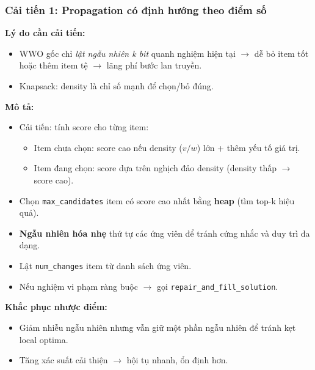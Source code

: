 \begin{frame}
    \frametitle{Cải tiến 1: Propagation có định hướng theo điểm số}
    \textbf{Lý do cần cải tiến:}
    \begin{itemize}
        \item WWO gốc chỉ \textit{lật ngẫu nhiên k bit} quanh nghiệm hiện tại $\rightarrow$ dễ bỏ item tốt hoặc thêm item tệ $\rightarrow$ lãng phí bước lan truyền.
        \item Knapsack: density là chỉ số mạnh để chọn/bỏ đúng.
    \end{itemize}
    \textbf{Mô tả:}
    \begin{itemize}
        \item Cải tiến: tính score cho từng item:
        \begin{itemize}
            \item Item chưa chọn: score cao nếu density ($v/w$) lớn + thêm yếu tố giá trị.
            \item Item đang chọn: score dựa trên nghịch đảo density (density thấp $\rightarrow$ score cao).
        \end{itemize}
         \item Chọn \texttt{max\_candidates} item có score cao nhất bằng \textbf{heap} (tìm top-k hiệu quả).
        \item \textbf{Ngẫu nhiên hóa nhẹ} thứ tự các ứng viên để tránh cứng nhắc và duy trì đa dạng.
        \item Lật \texttt{num\_changes} item từ danh sách ứng viên.
        \item Nếu nghiệm vi phạm ràng buộc $\rightarrow$ gọi \texttt{repair\_and\_fill\_solution}.
   
    \end{itemize}
    \textbf{Khắc phục nhược điểm:}
    \begin{itemize}
        \item Giảm nhiễu ngẫu nhiên nhưng vẫn giữ một phần ngẫu nhiên để tránh kẹt local optima.
        \item Tăng xác suất cải thiện $\rightarrow$ hội tụ nhanh, ổn định hơn.
    \end{itemize}
\end{frame}


